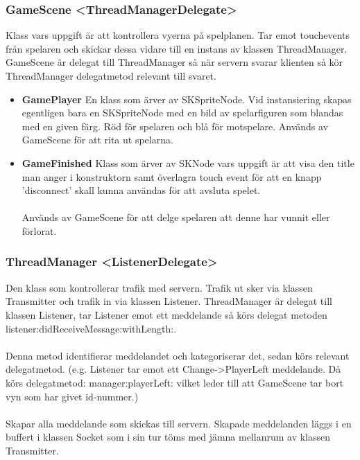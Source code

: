 \documentclass[10pt, titlepage, oneside, a4paper]{article}
\begin{document}
    		\newpage
    		\subsubsection{GameScene <ThreadManagerDelegate>}
    		Klass vars uppgift är att kontrollera vyerna på spelplanen. Tar emot touchevents från spelaren och skickar dessa vidare till en instans av klassen ThreadManager. GameScene är delegat till ThreadManager så när servern svarar klienten så kör ThreadManager delegatmetod relevant till svaret.
    		\begin{itemize}
    			\item\textbf{GamePlayer}
    			En klass som ärver av SKSpriteNode. Vid instansiering skapas egentligen bara en SKSpriteNode med en bild av spelarfiguren som blandas med en given färg. Röd för spelaren och blå för motspelare. Används av GameScene för att rita ut spelarna.
    			
    			\item\textbf{GameFinished} 
    			Klass som ärver av SKNode vars uppgift är att visa den title man anger i konstruktorn samt överlagra touch event för att en knapp 'disconnect' skall kunna användas för att avsluta spelet.\\\\Används av GameScene för att delge spelaren att denne har vunnit eller förlorat.
    			
    		\end{itemize}
    		\subsubsection{ThreadManager <ListenerDelegate>}
    		Den klass som kontrollerar trafik med servern. Trafik ut sker via klassen Transmitter och trafik in via klassen Listener. ThreadManager är delegat till klassen Listener, tar Listener emot ett meddelande så körs delegat metoden listener:didReceiveMessage:withLength:.\\\\Denna metod identifierar meddelandet och kategoriserar det, sedan körs relevant delegatmetod. (e.g. Listener tar emot ett Change->PlayerLeft meddelande. Då körs delegatmetod: manager:playerLeft: vilket leder till att GameScene tar bort vyn som har givet id-nummer.)\\\\Skapar alla meddelande som skickas till servern. Skapade meddelanden läggs i en buffert i klassen Socket som i sin tur töms med jämna mellanrum av klassen Transmitter.
\end{document}
